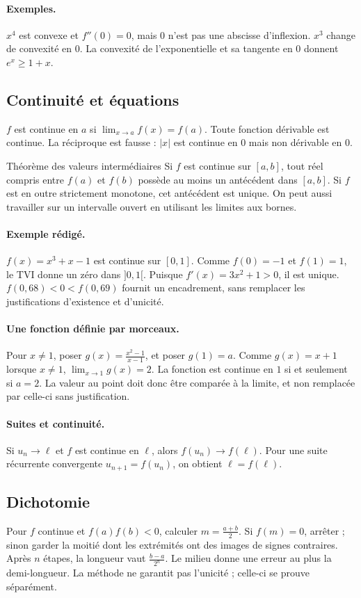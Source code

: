 \paragraph{Exemples.} $x^4$ est convexe et $f''(0)=0$, mais $0$ n'est pas une abscisse d'inflexion. $x^3$ change de convexité en $0$. La convexité de l'exponentielle et sa tangente en $0$ donnent $e^x\ge1+x$.
\subsection{Continuité et équations}
$f$ est continue en $a$ si $\lim_{x\to a}f(x)=f(a)$. Toute fonction dérivable est continue. La réciproque est fausse : $|x|$ est continue en $0$ mais non dérivable en $0$.
\begin{retenir}{Théorème des valeurs intermédiaires}
Si $f$ est continue sur $[a,b]$, tout réel compris entre $f(a)$ et $f(b)$ possède au moins un antécédent dans $[a,b]$. Si $f$ est en outre strictement monotone, cet antécédent est unique. On peut aussi travailler sur un intervalle ouvert en utilisant les limites aux bornes.
\end{retenir}
\paragraph{Exemple rédigé.} $f(x)=x^3+x-1$ est continue sur $[0,1]$. Comme $f(0)=-1$ et $f(1)=1$, le TVI donne un zéro dans $]0,1[$. Puisque $f'(x)=3x^2+1>0$, il est unique. $f(0{,}68)<0<f(0{,}69)$ fournit un encadrement, sans remplacer les justifications d'existence et d'unicité.
\paragraph{Une fonction définie par morceaux.} Pour $x\ne1$, poser $g(x)=\frac{x^2-1}{x-1}$, et poser $g(1)=a$. Comme $g(x)=x+1$ lorsque $x\ne1$, $\lim_{x\to1}g(x)=2$. La fonction est continue en $1$ si et seulement si $a=2$. La valeur au point doit donc être comparée à la limite, et non remplacée par celle-ci sans justification.
\paragraph{Suites et continuité.} Si $u_n\to\ell$ et $f$ est continue en $\ell$, alors $f(u_n)\to f(\ell)$. Pour une suite récurrente convergente $u_{n+1}=f(u_n)$, on obtient $\ell=f(\ell)$.
\subsection{Dichotomie}
Pour $f$ continue et $f(a)f(b)<0$, calculer $m=\frac{a+b}{2}$. Si $f(m)=0$, arrêter ; sinon garder la moitié dont les extrémités ont des images de signes contraires. Après $n$ étapes, la longueur vaut $\frac{b-a}{2^n}$. Le milieu donne une erreur au plus la demi-longueur. La méthode ne garantit pas l'unicité ; celle-ci se prouve séparément.



